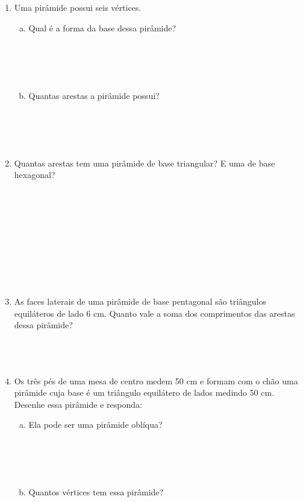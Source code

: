 \documentclass[a4paper,14pt]{article}
\begin{document}
\begin{multicols}{2}
\begin{enumerate}
\begin{enumerate}[a)]
		    \end{enumerate}
	        \item Uma pirâmide possui seis vértices.
	        \begin{enumerate}[a)]
	        	\item Qual é a forma da base dessa pirâmide? \\\\\\\\\\
	        	\item Quantas arestas a pirâmide possui? \\\\\\\\\\
	        \end{enumerate}
            \item Quantas arestas tem uma pirâmide de base triangular? E uma de base hexagonal? \\\\\\\\\\\\\\\\\\\\
            \item As faces laterais de uma pirâmide de base pentagonal são triângulos equiláteros de lado 6 cm. Quanto vale a soma dos comprimentos das arestas dessa pirâmide? \\\\\\\\
            \item Os três pés de uma mesa de centro medem 50 cm e formam com o chão uma pirâmide cuja base é um triângulo equilátero de lados medindo 50 cm. Desenhe essa pirâmide e responda:
            \begin{enumerate}[a)]
            	\item Ela pode ser uma pirâmide oblíqua? \\\\\\\\\\
            	\item Quantos vértices tem essa pirâmide? \\\\\\\\\\

\end{enumerate}
\end{enumerate}
\end{multicols}
\end{document}
